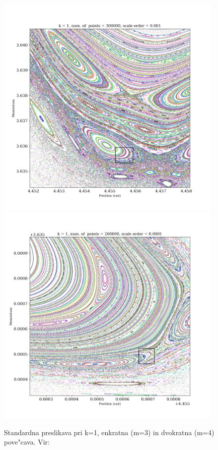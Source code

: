 \documentclass[]{article}
\begin{document}
\begin{figure}[!htb]
	\begin{center}
		\includegraphics[width = 11cm]{stdmap4}
		\includegraphics[width = 11cm]{stdmap5}
		\caption{Standardna preslikava pri k=1, enkratna (m=3) in dvokratna (m=4) pove"cava. Vir: \cite{1}}
		\label{slika 8}
	\end{center}
\end{figure}
\end{document}
